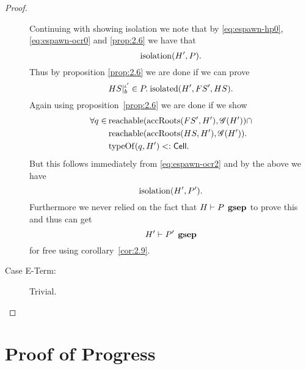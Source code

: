 \begin{proof}
\begin{description}
      Continuing with showing isolation we note that by \eqref{eq:espawn-hp0},
      \eqref{eq:espawn-ocr0} and \ref{prop:2.6} we have that
      \begin{equation}
        \mbox{$\mathrm{isolation}$}(H', P).
      \end{equation}
      Thus by proposition \ref{prop:2.6} we are done if we can prove 
      \begin{equation}
        HS|_b^{\iota'} \in P. \: \mbox{$\mathrm{isolated}$}(H', FS', HS).
      \end{equation}
      Again using proposition~\ref{prop:2.6} we are done if we show
      \begin{equation}
        \begin{aligned}
          \forall q \in \: &\mbox{$\mathrm{reachable}$}(\mbox{$\mathrm{accRoots}$}(FS', H'), \mathscr{G}(H')) \cap \\
            &\mbox{$\mathrm{reachable}$}(\mbox{$\mathrm{accRoots}$}(HS, H'), \mathscr{G}(H')) . \\
            &\mbox{$\mathrm{typeOf}$}(q, H') <: \mbox{$\mathsf{Cell}$}.
        \end{aligned}
      \end{equation}
      But this follows immediately from \eqref{eq:espawn-ocr2} and 
      by the above we have
      \begin{equation}
        \mbox{$\mathrm{isolation}$}(H', P').
      \end{equation} 
      Furthermore we never relied on the fact that $H \vdash P \:\: \mbox{\bf gsep}$ to
      prove this and thus can get
      \begin{equation}
        H' \vdash P' \:\: \mbox{\bf gsep} 
      \end{equation}
      for free using corollary~\ref{cor:2.9}.

    \item[Case {\sc E-Term}:] Trivial.
  \end{description}
\end{proof}


\section{Proof of Progress}
\label{sec:proof_of_progress}

